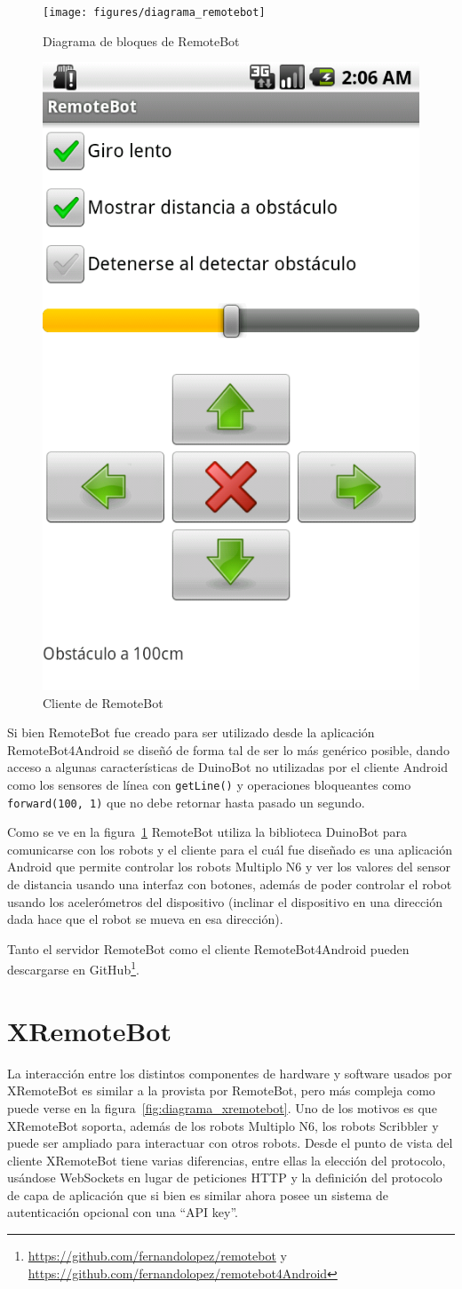 \begin{figure}
    \centering
    \texttt{[image: figures/diagrama\_remotebot]}
    \caption{Diagrama de bloques de RemoteBot}
    \label{fig:diagrama_remotebot}
\end{figure}
\begin{figure}
    \centering
    \includegraphics[width=.20\textwidth]{figures/cliente_remotebot}
    \caption{Cliente de RemoteBot}
    \label{fig:cliente_remotebot}
\end{figure}

Si bien RemoteBot fue creado para ser utilizado desde la
aplicación RemoteBot4Android
se diseñó de forma tal de ser lo más genérico posible, dando acceso
a algunas características de DuinoBot no utilizadas por el cliente
Android como los sensores de línea con \texttt{getLine()} y operaciones
bloqueantes como \texttt{forward(100, 1)} que no debe retornar
hasta pasado un segundo.

Como se ve en la figura~\ref{fig:diagrama_remotebot} RemoteBot utiliza la
biblioteca DuinoBot para comunicarse con los robots y el cliente para el cuál
fue diseñado es una aplicación Android que permite controlar los robots
Multiplo N6
y ver los valores del sensor de distancia usando una interfaz con botones,
además de poder controlar el robot usando los acelerómetros del dispositivo
(inclinar el dispositivo en una dirección dada hace que el robot se mueva
en esa dirección).

Tanto el servidor RemoteBot como el cliente RemoteBot4Android pueden
descargarse en
GitHub\footnote{\url{https://github.com/fernandolopez/remotebot} y\\
\url{https://github.com/fernandolopez/remotebot4Android}}.

\section{XRemoteBot}\label{sec:xremotebot}

La interacción entre los distintos componentes de hardware y software usados
por XRemoteBot es similar a la provista por RemoteBot,
pero más compleja como puede verse
en la figura~\ref{fig:diagrama_xremotebot}. Uno de los motivos es que
XRemoteBot soporta, además de los robots Multiplo N6,
los robots Scribbler y puede ser
ampliado para interactuar con otros robots. Desde el punto de vista del cliente
XRemoteBot tiene varias diferencias, entre ellas la elección del protocolo,
usándose WebSockets en lugar de peticiones HTTP y la definición del protocolo
de capa de aplicación que si bien es similar ahora posee un sistema de
autenticación opcional con una ``API key''.

